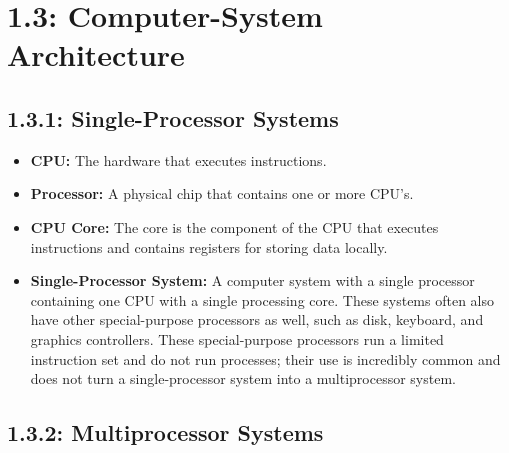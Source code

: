 \documentclass[12pt]{article}
\begin{document}
\section*{1.3: Computer-System Architecture}

\subsection*{1.3.1: Single-Processor Systems}

\begin{itemize}
    \item \textbf{CPU:} The hardware that executes instructions.
    \item \textbf{Processor:} A physical chip that contains one or more CPU's.
    \item \textbf{CPU Core:} The core is the component of the CPU that executes instructions and contains registers for storing data locally.
    \item \textbf{Single-Processor System:} A computer system with a single processor containing one CPU with a single processing core. These systems often also have other special-purpose processors as well, such as disk, keyboard, and graphics controllers. These special-purpose processors run a limited instruction set and do not run processes; their use is incredibly common and does not turn a single-processor system into a multiprocessor system.
\end{itemize}

\subsection*{1.3.2: Multiprocessor Systems}
\end{document}
